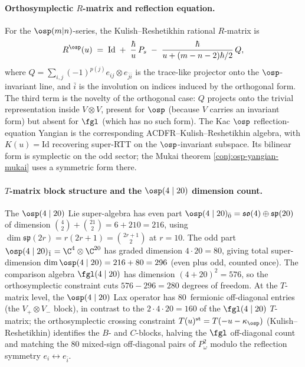 \paragraph{Orthosymplectic \texorpdfstring{$R$}{R}-matrix and reflection equation.}
For the $\osp(m|n)$-series, the Kulish--Reshetikhin rational
$R$-matrix is
\[
 R^{\osp}(u) \;=\; \mathrm{Id}
 \;+\; \frac{\hbar}{u}\, P_s
 \;-\; \frac{\hbar}{u + (m - n - 2)\hbar / 2}\, Q,
\]
where $Q = \sum_{i,j} (-1)^{p(j)} e_{ij} \otimes e_{\bar j \bar i}$
is the trace-like projector onto the $\osp$-invariant line, and
$\bar i$ is the involution on indices induced by the orthogonal
form. The third term is the novelty of the orthogonal case:
$Q$ projects onto the trivial representation inside
$V \otimes V$, present for $\osp$ (because $V$ carries an
invariant form) but absent for $\fgl$ (which has no such form).
The Kac $\osp$ reflection-equation Yangian is the corresponding
ACDFR--Kulish--Reshetikhin algebra, with $K(u)=\mathrm{Id}$ recovering
super-RTT on the $\osp$-invariant subspace. Its bilinear form is
symplectic on the odd sector; the Mukai theorem
\ref{conj:osp-yangian-mukai} uses a symmetric form there.

\paragraph{\texorpdfstring{$T$}{T}-matrix block structure and the \texorpdfstring{$\osp(4 \mid 20)$}{osp(4 mid 20)} dimension count.}
The $\osp(4 \mid 20)$ Lie super-algebra has even part
$\osp(4 \mid 20)_{\bar 0} = \mathfrak{so}(4) \oplus \mathfrak{sp}(20)$
of dimension $\binom{4}{2} + \binom{21}{2} = 6 + 210 = 216$,
using $\dim \mathfrak{sp}(2r) = r(2r+1) = \binom{2r+1}{2}$ at
$r = 10$. The odd part
$\osp(4 \mid 20)_{\bar 1} = \C^4 \otimes \C^{20}$ has graded
dimension $4 \cdot 20 = 80$, giving total super-dimension
$\dim \osp(4 \mid 20) = 216 + 80 = 296$ (even plus odd, counted
once). The comparison algebra $\fgl(4 \mid 20)$ has dimension
$(4 + 20)^2 = 576$, so the orthosymplectic constraint cuts
$576 - 296 = 280$ degrees of freedom. At the $T$-matrix level,
the $\osp(4 \mid 20)$ Lax operator has $80$~fermionic off-diagonal
entries (the $V_+ \otimes V_-$ block), in contrast to the $2 \cdot
4 \cdot 20 = 160$ of the $\fgl(4 \mid 20)$ $T$-matrix; the
orthosymplectic crossing constraint
$T(u)^{\mathrm{st}} = T(-u - \kappa_{\osp})$
(Kulish--Reshetikhin) identifies the $B$- and $C$-blocks,
halving the $\fgl$ off-diagonal count and matching the $80$
mixed-sign off-diagonal pairs of $P_\omega^2$ modulo the
reflection symmetry $e_i \leftrightarrow e_{\bar i}$.

